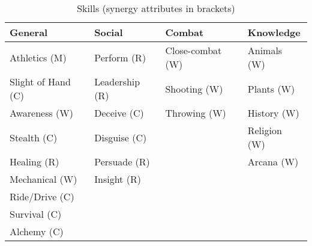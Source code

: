 \documentclass[a4paper,oneside,11pt]{article}
\begin{document}
\begin{table}[ht!]
	\centering
	\caption{Skills (synergy attributes in brackets)}
	\begin{tabular}{|l|l|l|l|}
		\hline
		General & Social & Combat & Knowledge\\ [0.5ex]
		\hline
		Athletics (M) & Perform (R) & Close-combat (W) & Animals (W)\\
		Slight of Hand (C) & Leadership (R) & Shooting (W) & Plants (W)\\
		Awareness (W) & Deceive (C) & Throwing (W) & History (W)\\
		Stealth (C) & Disguise (C) &  & Religion (W) \\
		Healing (R)  & Persuade (R) &  & Arcana (W)\\
		Mechanical (W)  & Insight (R) & & \\
		Ride/Drive (C) & & & \\
		Survival (C) & & & \\
		Alchemy (C) & & & \\
		\hline
	\end{tabular}
\end{table}
\end{document}
